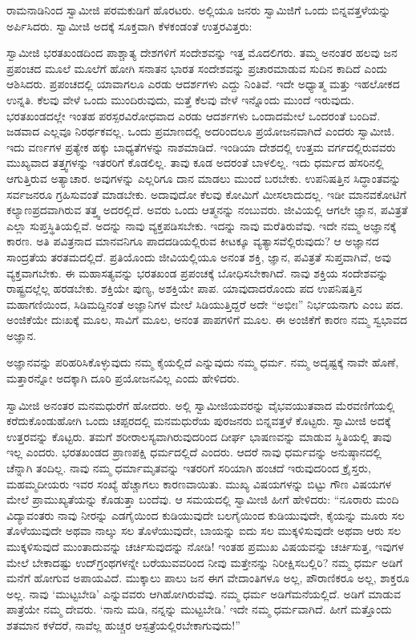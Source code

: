  ರಾಮನಾಡಿನಿಂದ ಸ್ವಾಮೀಜಿ ಪರಮಕುಡಿಗೆ ಹೊರಟರು. ಅಲ್ಲಿಯೂ ಜನರು ಸ್ವಾಮಿಜಿಗೆ ಒಂದು ಬಿನ್ನವತ್ತಳೆಯನ್ನು ಅರ್ಪಿಸಿದರು. ಸ್ವಾಮೀಜಿ ಅದಕ್ಕೆ ಸೂಕ್ತವಾಗಿ ಕೆಳಕಂಡಂತೆ ಉತ್ತರವಿತ್ತರು: 

 ಸ್ವಾಮೀಜಿ ಭರತಖಂಡದಿಂದ ಪಾಶ್ಚಾತ್ಯ ದೇಶಗಳಿಗೆ ಸಂದೇಶವನ್ನು ಇತ್ತ ಮೊದಲಿಗರು. ತಮ್ಮ ಅನಂತರ ಹಲವು ಜನ ಪ್ರಪಂಚದ ಮೂಲೆ ಮೂಲೆಗೆ ಹೋಗಿ ಸನಾತನ ಭಾರತ ಸಂದೇಶವನ್ನು ಪ್ರಚಾರಮಾಡುವ ಸುದಿನ ಕಾದಿದೆ ಎಂದು ಆಶಿಸಿದರು. ಪ್ರಪಂಚದಲ್ಲಿ ಯಾವಾಗಲೂ ಎರಡು ಆದರ್ಶಗಳು ಎದ್ದು ನಿಂತಿವೆ. ಇದೇ ಅಧ್ಯಾತ್ಮ ಮತ್ತು ಇಹಲೋಕದ ಉನ್ನತಿ. ಕೆಲವು ವೇಳೆ ಒಂದು ಮುಂದಿರುವುದು, ಮತ್ತೆ ಕೆಲವು ವೇಳೆ ಇನ್ನೊಂದು ಮುಂದೆ ಇರುವುದು. ಭರತಖಂಡದಲ್ಲೇ ಇಂತಹ ಪರಸ್ಪರ\break ವಿರೋಧವಾದ ಎರಡು ಆದರ್ಶಗಳು ಒಂದಾದಮೇಲೆ ಒಂದರಂತೆ ಬಂದಿವೆ. ಜಡವಾದ ಎಲ್ಲವೂ ನಿರರ್ಥಕವಲ್ಲ. ಒಂದು ಪ್ರಮಾಣದಲ್ಲಿ ಅದರಿಂದಲೂ ಪ್ರಯೋಜನವಾಗಿದೆ ಎಂದರು ಸ್ವಾಮೀಜಿ. ಇದು ವರ್ಣಗಳ ಪ್ರತ್ಯೇಕ ಹಕ್ಕು ಬಾಧ್ಯತೆಗಳನ್ನು ನಾಶಮಾಡಿದೆ. ಇಂಡಿಯಾ ದೇಶದಲ್ಲಿ ಉತ್ತಮ ವರ್ಗದಲ್ಲಿರುವವರು ಮುಖ್ಯವಾದ ತತ್ತ್ವಗಳನ್ನು ಇತರರಿಗೆ ಕೊಡಲಿಲ್ಲ. ತಾವು ಕೂಡ ಅದರಂತೆ ಬಾಳಲಿಲ್ಲ. ಇದು ಧರ್ಮದ ಹೆಸರಿನಲ್ಲಿ ಆಗುತ್ತಿರುವ ಅತ್ಯಾಚಾರ. ಅವುಗಳನ್ನು ಎಲ್ಲರಿಗೂ ದಾನ ಮಾಡಲು ಮುಂದೆ ಬರಬೇಕು. ಉಪನಿಷತ್ತಿನ ಸಿದ್ಧಾಂತವನ್ನು ಸರ್ವಜನರೂ ಗ್ರಹಿಸುವಂತೆ ಮಾಡಬೇಕು. ಅದಾವುದೋ ಕೆಲವು ಕೋಮಿಗೆ ಮೀಸಲಾದುದಲ್ಲ. ಇಡೀ ಮಾನವಕೋಟಿಗೆ ಕಲ್ಯಾಣಪ್ರದವಾಗಿರುವ ತತ್ತ್ವ ಅದರಲ್ಲಿದೆ. ಅವರು ಒಂದು ಆತ್ಮನನ್ನು ನಂಬುವರು. ಜೀವಿಯಲ್ಲಿ ಆಗಲೇ ಜ್ಞಾನ, ಪವಿತ್ರತೆ ಎಲ್ಲಾ ಸುಪ್ತಸ್ಥಿತಿಯಲ್ಲಿವೆ. ಅದನ್ನು ನಾವು ವ್ಯಕ್ತಪಡಿಸಬೇಕು. ಇದನ್ನು ನಾವು ಮರೆತಿರುವೆವು. ಇದೇ ನಮ್ಮ ಅಜ್ಞಾನಕ್ಕೆ ಕಾರಣ. ಅತಿ ಪವಿತ್ರನಾದ ಮಾನವನಿಗೂ ಪಾದದಡಿಯಲ್ಲಿರುವ ಕೀಟಕ್ಕೂ ವ್ಯತ್ಯಾಸವೆಲ್ಲಿರುವುದು? ಆ ಅಜ್ಞಾನದ ಸಾಂದ್ರತೆಯ ತರತಮದಲ್ಲಿದೆ. ಪ್ರತಿಯೊಂದು ಜೀವಿಯಲ್ಲಿಯೂ ಅನಂತ ಶಕ್ತಿ, ಜ್ಞಾನ, ಪವಿತ್ರತೆ ಸುಪ್ತವಾಗಿವೆ, ಅವು ವ್ಯಕ್ತವಾಗಬೇಕು. ಈ ಮಹಾಸತ್ಯವನ್ನು ಭರತಖಂಡ ಪ್ರಪಂಚಕ್ಕೆ ಬೋಧಿಸಬೇಕಾಗಿದೆ. ನಾವು ಶಕ್ತಿಯ ಸಂದೇಶವನ್ನು ರಾಷ್ಟ್ರದಲ್ಲೆಲ್ಲ ಹರಡಬೇಕು. ಶಕ್ತಿಯೇ ಪುಣ್ಯ, ಅಶಕ್ತಿಯೇ ಪಾಪ. ಯಾವುದಾದರೊಂದು ಪದ ಉಪನಿಷತ್ತಿನ ಮಹಾಗಣಿಯಿಂದ, ಸಿಡಿಮದ್ದಿನಂತೆ ಅಜ್ಞಾನಿಗಳ ಮೇಲೆ ಸಿಡಿಯುತ್ತಿದ್ದರೆ ಅದೇ “ಅಭೀಃ” ನಿರ್ಭಯನಾಗು ಎಂಬ ಪದ. ಅಂಜಿಕೆಯೇ ದುಃಖಕ್ಕೆ ಮೂಲ, ಸಾವಿಗೆ ಮೂಲ, ಅನಂತ ಪಾಪಗಳಿಗೆ ಮೂಲ. ಈ ಅಂಜಿಕೆಗೆ ಕಾರಣ ನಮ್ಮ ಸ್ವಭಾವದ ಅಜ್ಞಾನ. 

\vskip 2pt

 ಅಜ್ಞಾನವನ್ನು ಪರಿಹರಿಸಿಕೊಳ್ಳುವುದು ನಮ್ಮ ಕೈಯಲ್ಲಿದೆ ಎನ್ನುವುದು ನಮ್ಮ ಧರ್ಮ. ನಮ್ಮ ಅದೃಷ್ಟಕ್ಕೆ ನಾವೇ ಹೊಣೆ, ಮತ್ತಾರನ್ನೋ ಅದಕ್ಕಾಗಿ ದೂರಿ ಪ್ರಯೋಜನವಿಲ್ಲ ಎಂದು ಹೇಳಿದರು. 

\vskip 2pt

 ಸ್ವಾಮೀಜಿ ಅನಂತರ ಮನಮಧುರೆಗೆ ಹೋದರು. ಅಲ್ಲಿ ಸ್ವಾಮೀಜಿಯವರನ್ನು ವೈಭವಯುತವಾದ ಮೆರವಣಿಗೆಯಲ್ಲಿ ಕರೆದುಕೊಂಡುಹೋಗಿ ಒಂದು ಚಪ್ಪರದಲ್ಲಿ ಮನಮಧುರೆಯ ಪುರಜನರು ಬಿನ್ನವತ್ತಳೆ ಕೊಟ್ಟರು. ಸ್ವಾಮೀಜಿ ಅದಕ್ಕೆ ಉತ್ತರವನ್ನು ಕೊಟ್ಟರು. ತಮಗೆ ಶರೀರಾಲಸ್ಯವಾಗಿರುವುದರಿಂದ ದೀರ್ಘ ಭಾಷಣವನ್ನು ಮಾಡುವ ಸ್ಥಿತಿಯಲ್ಲಿ ತಾವು ಇಲ್ಲ ಎಂದರು. ಭರತಖಂಡದ ಪ್ರಾಣಪಕ್ಷಿ ಧರ್ಮದಲ್ಲಿದೆ ಎಂದರು. ಆದರೆ ನಾವು ಧರ್ಮವನ್ನು ಅನುಷ್ಠಾನದಲ್ಲಿ ಚೆನ್ನಾಗಿ ತಂದಿಲ್ಲ. ನಾವು ನಮ್ಮ ಧರ್ಮಾಮೃತವನ್ನು ಇತರರಿಗೆ ಸರಿಯಾಗಿ ಹಂಚದೆ ಇರುವುದರಿಂದ ಕ್ರೈಸ್ತರು, ಮಹಮ್ಮದೀಯರು ಇವರ ಸಂಖ್ಯೆ ಹೆಚ್ಚಾಗಲು ಕಾರಣವಾಯಿತು. ಮುಖ್ಯ ವಿಷಯಗಳನ್ನು ಬಿಟ್ಟು ಗೌಣ ವಿಷಯಗಳ ಮೇಲೆ ಪ್ರಾಮುಖ್ಯತೆಯನ್ನು ಕೊಡುತ್ತಾ ಬಂದೆವು. ಆ ಸಮಯದಲ್ಲಿ ಸ್ವಾಮೀಜಿ ಹೀಗೆ ಹೇಳಿದರು: “ನೂರಾರು ಮಂದಿ ವಿದ್ಯಾವಂತರು ನಾವು ನೀರನ್ನು ಎಡಗೈಯಿಂದ ಕುಡಿಯುವುದೇ ಬಲಗೈಯಿಂದ ಕುಡಿಯುವುದೇ, ಕೈಯನ್ನು ಮೂರು ಸಲ ತೊಳೆಯುವುದೇ ಅಥವಾ ನಾಲ್ಕು ಸಲ ತೊಳೆಯುವುದೇ, ಬಾಯನ್ನು ಐದು ಸಲ ಮುಕ್ಕಳಿಸುವುದೇ ಅಥವಾ ಆರು ಸಲ ಮುಕ್ಕಳಿಸುವುದೆ ಮುಂತಾದುವನ್ನು ಚರ್ಚಿಸುವುದನ್ನು ನೋಡಿ! ಇಂತಹ ಪ್ರಮುಖ ವಿಷಯವನ್ನು ಚರ್ಚಿಸುತ್ತ, ಇವುಗಳ ಮೇಲೆ ಬೇಕಾದಷ್ಟು ಉದ್‌ಗ್ರಂಥಗಳನ್ನೇ ಬರೆಯುವವರಿಂದ ನೀವು ಮತ್ತೇನನ್ನು ನಿರೀಕ್ಷಿಸಬಲ್ಲಿರಿ? ನಮ್ಮ ಧರ್ಮ ಅಡಿಗೆ ಮನೆಗೆ ಹೋಗುವ ಅಪಾಯವಿದೆ. ಮುಕ್ಕಾಲು ಪಾಲು ಜನ ಈಗ ವೇದಾಂತಿಗಳೂ ಅಲ್ಲ, ಪೌರಾಣಿಕರೂ ಅಲ್ಲ, ಶಾಕ್ತರೂ ಅಲ್ಲ. ನಾವು ‘ಮುಟ್ಟಬೇಡಿ’ ಎನ್ನುವವರು ಆಗಿಹೋಗಿರುವೆವು. ನಮ್ಮ ಧರ್ಮ ಅಡಿಗೆಮನೆಯಲ್ಲಿದೆ. ಅಡಿಗೆ ಮಾಡುವ ಪಾತ್ರೆಯೇ ನಮ್ಮ ದೇವರು. ‘ನಾನು ಮಡಿ, ನನ್ನನ್ನು ಮುಟ್ಟಬೇಡಿ.’ ಇದೇ ನಮ್ಮ ಧರ್ಮವಾಗಿದೆ. ಹೀಗೆ ಮತ್ತೊಂದು ಶತಮಾನ ಕಳೆದರೆ, ನಾವೆಲ್ಲ ಹುಚ್ಚರ ಆಸ್ಪತ್ರೆಯಲ್ಲಿರಬೇಕಾಗುವುದು!” 

